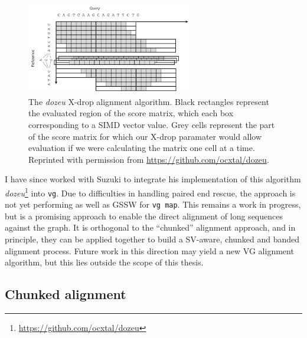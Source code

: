 \begin{figure}[htbp!] 
\centering    
\includegraphics[width=0.65\textwidth]{Chapter2/Figs/xdrop.png}
\caption[The \emph{dozeu} X-drop alignment algorithm]{
  The \emph{dozeu} X-drop alignment algorithm.
  Black rectangles represent the evaluated region of the score matrix, which each box corresponding to a SIMD vector value.
  Grey cells represent the part of the score matrix for which our X-drop paramater would allow evaluation if we were calculating the matrix one cell at a time.
  Reprinted with permission from \url{https://github.com/ocxtal/dozeu}.
}
\label{fig:xdrop}
\end{figure}

I have since worked with Suzuki to integrate his implementation of this algorithm \emph{dozeu}\footnote{\url{https://github.com/ocxtal/dozeu}} into {\tt vg}.
Due to difficulties in handling paired end rescue, the approach is not yet performing as well as GSSW for {\tt vg map}.
This remains a work in progress, but is a promising approach to enable the direct alignment of long sequences against the graph.
It is orthogonal to the ``chunked'' alignment approach, and in principle, they can be applied together to build a SV-aware, chunked and banded alignment process.
Future work in this direction may yield a new VG alignment algorithm, but this lies outside the scope of this thesis.

\subsection{Chunked alignment}
\label{sec:chunked_alignment}


